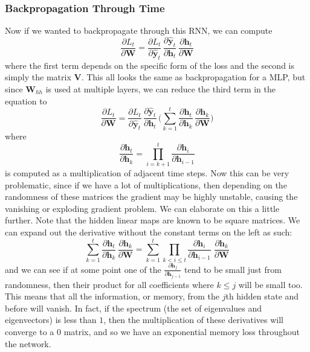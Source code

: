\documentclass{article}
\begin{document}
    \subsubsection{Backpropagation Through Time}

      Now if we wanted to backpropagate through this RNN, we can compute 
      \[\frac{\partial L_t}{\partial \mathbf{W}} = \frac{\partial L_t}{\partial \hat{\mathbf{y}}_t} \, \frac{\partial \hat{\mathbf{y}}_t}{\partial \mathbf{h}_t} \, \frac{\partial \mathbf{h}_t}{\partial \mathbf{W}}\]
      where the first term depends on the specific form of the loss and the second is simply the matrix $\mathbf{V}$. This all looks the same as backpropagation for a MLP, but since $\mathbf{W}_{hh}$ is used at multiple layers, we can reduce the third term in the equation to 
      \[\frac{\partial L_t}{\partial \mathbf{W}} = \frac{\partial L_t}{\partial \hat{\mathbf{y}}_t} \, \frac{\partial \hat{\mathbf{y}}_t}{\partial \mathbf{h}_t} \, \bigg(\sum_{k=1}^t \frac{\partial \mathbf{h}_t}{\partial \mathbf{h}_k} \, \frac{\partial \mathbf{h}_k}{\partial \mathbf{W}} \bigg)\]
      where 
      \[\frac{\partial \mathbf{h}_t}{\partial \mathbf{h}_k}  = \prod_{i=k+1}^{t} \frac{\partial \mathbf{h}_i}{\partial \mathbf{h}_{i-1}}\]
      is computed as a multiplication of adjacent time steps. Now this can be very problematic, since if we have a lot of multiplications, then depending on the randomness of these matrices the gradient may be highly unstable, causing the vanishing or exploding gradient problem. We can elaborate on this a little further. Note that the hidden linear maps are known to be square matrices. We can expand out the derivative without the constant terms on the left as such: 
      \[\sum_{k=1}^t \frac{\partial \mathbf{h}_t}{\partial \mathbf{h}_k} \, \frac{\partial \mathbf{h}_k}{\partial \mathbf{W}} = \sum_{k=1}^t \prod_{k < i \leq t} \frac{\partial \mathbf{h}_i}{\partial \mathbf{h}_{i-1}} \; \frac{\partial \mathbf{h}_k}{\partial \mathbf{W}}\]
      and we can see if at some point one of the $\frac{\partial \mathbf{h}_j}{\partial \mathbf{h}_{j-1}}$ tend to be small just from randomness, then their product for all coefficients where $k \leq j$ will be small too. This means that all the information, or memory, from the $j$th hidden state and before will vanish. In fact, if the spectrum (the set of eigenvalues and eigenvectors) is less than $1$, then the multiplication of these derivatives will converge to a $0$ matrix, and so we have an exponential memory loss throughout the network. 
\end{document}
